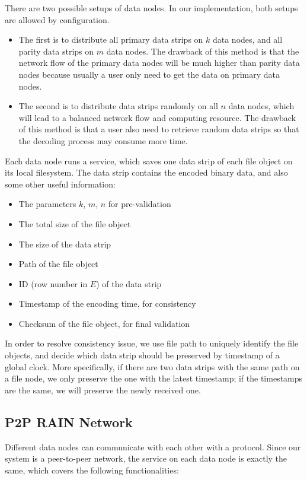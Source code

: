 \documentclass[conference]{IEEEtran}
\begin{document}
There are two possible setups of data nodes. In our implementation, both setups are allowed by configuration.
\begin{itemize}
    \item The first is to distribute all primary data strips on $k$ data nodes, and all parity data strips on $m$ data nodes. The drawback of this method is that the network flow of the primary data nodes will be much higher than parity data nodes because usually a user only need to get the data on primary data nodes.
    \item The second is to distribute data strips randomly on all $n$ data nodes, which will lead to a balanced network flow and computing resource. The drawback of this method is that a user also need to retrieve random data strips so that the decoding process may consume more time.
\end{itemize}

Each data node runs a service, which saves one data strip of each file object on its local filesystem. The data strip contains the encoded binary data, and also some other useful information:
\begin{itemize}
    \item The parameters $k$, $m$, $n$ for pre-validation
    \item The total size of the file object
    \item The size of the data strip
    \item Path of the file object
    \item ID (row number in $E$) of the data strip
    \item Timestamp of the encoding time, for consistency
    \item Checksum of the file object, for final validation
\end{itemize}

In order to resolve consistency issue, we use file path to uniquely identify the file objects, and decide which data strip should be preserved by timestamp of a global clock. More specifically, if there are two data strips with the same path on a file node, we only preserve the one with the latest timestamp; if the timestamps are the same, we will preserve the newly received one.

\subsection{P2P RAIN Network}

Different data nodes can communicate with each other with a protocol. Since our system is a peer-to-peer network, the service on each data node is exactly the same, which covers the following functionalities:
\end{document}
